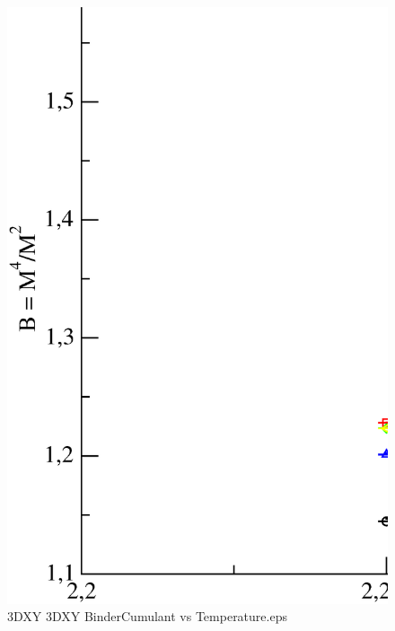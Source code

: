\begin{figure}[!htpb]
  \centering
  \includegraphics[width=\textwidth]{./plots/3DXY/3DXY_BinderCumulant_vs_Temperature.eps}
  \caption{3DXY 3DXY BinderCumulant vs Temperature.eps}
\end{figure}

